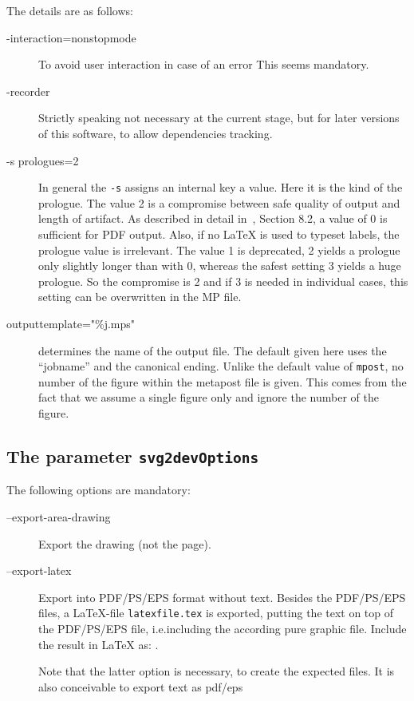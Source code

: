 The details are as follows: 
%
\begin{description}
  \item[{-interaction=nonstopmode}] To avoid user interaction in case of an error 
  This seems mandatory. 
  \item[{-recorder}] Strictly speaking not necessary at the current stage, 
    but for later versions of this software, to allow dependencies tracking. 
  \item[{-s prologues=2}] In general the \texttt{-s} assigns an internal key a value. 
  Here it is the kind of the prologue. 
  The value 2 is a compromise between safe quality of output and length of artifact. 
  As described in detail in~\cite{MPost24}, Section 8.2, 
  a value of 0 is sufficient for PDF output. 
  Also, if no \LaTeX{} is used to typeset labels, the prologue value is irrelevant. 
  The value 1 is deprecated, 2 yields a prologue only slightly longer than with 0, 
  whereas the safest setting 3 yields a huge prologue. 
  So the compromise is 2 and if 3 is needed in individual cases, 
  this setting can be overwritten in the MP file. 
  \item[{outputtemplate="\%j.mps"}] determines the name of the output file. %
  The default given here uses the ``jobname'' and the canonical ending. 
  Unlike the default value of \texttt{mpost}, 
  no number of the figure within the metapost file is given. 
  This comes from the fact that we assume a single figure only 
  and ignore the number of the figure. 
  \end{description}



\subsection{The parameter \texttt{svg2devOptions}}%
\label{subsec:svg2devOptions}

The following options are mandatory: 
%
\begin{description}
\item[--export-area-drawing] 
Export the drawing (not the page). 
\item[--export-latex] 
Export into PDF/PS/EPS format without text. 
Besides the PDF/PS/EPS files, a \LaTeX-file \texttt{latexfile.tex} is exported,
putting the text on top of the PDF/PS/EPS file, 
i.e.\@ including the according pure graphic file. 
Include the result in \LaTeX{} as: . 

Note that the latter option is necessary, 
to create the expected files. 
It is also conceivable to export text as pdf/eps 
\end{description}

